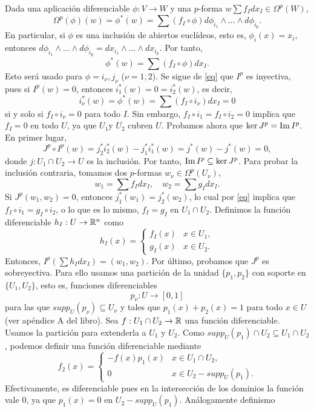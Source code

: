 \documentclass[CV.tex]{subfiles}
\begin{document}
\begin{dem}
Dada una aplicación diferenciable $\phi:V\to W$ y una $p$-forma $w\sum f_Idx_I\in\Omega^p(W)$, 
\[
\Omega^p(\phi)(w)=\phi^*(w)=\sum(f_I\circ\phi)d\phi_{i_1}\land\dots\land d\phi_{i_p}.
\]
En particular, si $\phi$ es una inclusión de abiertos euclídeos, esto es, $\phi_i(x)=x_i$, entonces $d\phi_{i_1}\land\dots\land d\phi_{i_p}=dx_{i_1}\land\dots\land dx_{i_p}$. Por tanto, 
\begin{equation}\label{eq}
\phi^*(w)=\sum(f_I\circ\phi)dx_I.
\end{equation}
Esto será usado para $\phi= i_{\nu},j_{\nu}$ ($\nu=1,2$). Se sigue de \ref{eq} que $I^p$ es inyectiva, pues si $I^p(w)=0$, entonces $i_1^*(w)=0=i_2^*(w)$, es decir,
\[
i_{\nu}^*(w)=\phi^*(w)=\sum(f_I\circ i_{\nu})dx_I=0
\]
si y solo si $f_I\circ i_{\nu}=0$ para todo $I$. Sin embargo, $f_I\circ i_{1}= f_I\circ i_{2}=0$ implica que $f_I=0$ en todo $U$, ya que $U_1$y $U_2$ cubren $U$. Probamos ahora que $\ker{J^p}=\operatorname{Im}{I^p}$.  En primer lugar, 
\[
J^p\circ I^p(w)=j_2^*i_2^*(w)-j_1^*i_1^*(w)=j^*(w)-j^*(w)=0,
\]
donde $j:U_1\cap U_2\to U$ es la inclusión. Por tanto, $\operatorname{Im}{I^p}\subseteq \ker{J^p}$. Para probar la inclusión contraria, tomamos dos $p$-formas $w_{\nu}\in\Omega^p(U_{\nu})$,
\[
w_1=\sum f_Idx_I,\quad w_2=\sum g_Idx_I.
\]
Si $J^p(w_1,w_2)=0$, entonces $j^*_1(w_1)=j_2^*(w_2)$, lo cual por \ref{eq} implica que $f_I\circ i_1= g_I\circ i_2$, o lo que es lo mismo, $f_I=g_I$ en $U_1\cap U_2$. Definimos la función diferenciable $h_I:U\to\mathbb{R}^n$ como
\[
h_I(x)=\begin{cases}
f_I(x) & x\in U_1,\\
g_I(x) & x\in U_2.
\end{cases}
\]
Entonces, $I^p(\sum h_Idx_I)=(w_1,w_2)$. Por último, probamos que $J^p$ es sobreyectiva. Para ello usamos una partición de la unidad $\{p_1,p_2\}$ con soporte en $\{U_1, U_2\}$, esto es, funciones diferenciables
\[
p_{\nu}:U\to [0,1]
\]
para las que $supp_U(p_{\nu})\subseteq U_{\nu}$ y tales que $p_1(x)+p_2(x)=1$ para todo $x\in U$ (ver apéndice A del libro). Sea $f:U_1\cap U_2\to \mathbb{R}$ una función diferenciable. Usamos la partición para extenderla a $U_1$ y $U_2$. Como $supp_U(p_1)\cap U_2\subseteq U_1\cap U_2$, podemos definir una función diferenciable mediante
\[
f_2(x)=\begin{cases}
-f(x)p_1(x) & x\in U_1\cap U_2,\\
0 & x\in U_2-supp_U(p_1).
\end{cases}
\]
Efectivamente, es diferenciable pues en la intersección de los dominios la función vale 0, ya que $p_1(x)=0$ en $U_2-supp_U(p_1)$.  Análogamente definismo

\end{dem}
\end{document}
